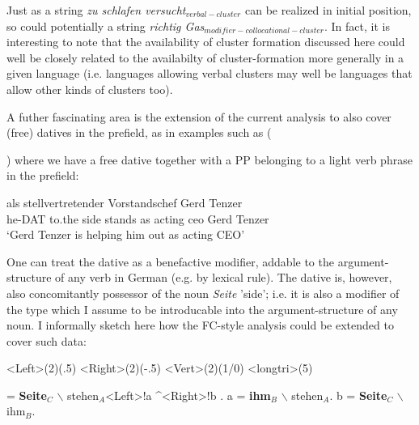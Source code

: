 \documentclass[11pt,a4paper,fleqn]{article}
\newcounter{lsptempcnt}
\newcommand{\mex}[1]{\setcounter{lsptempcnt}{\value{equation}}%
\addtocounter{lsptempcnt}{#1}%
\arabic{lsptempcnt}}%
\begin{document}
\noindent Just as a string \textit{zu schlafen versucht$_{verbal-cluster}$} can be realized in initial position, so could potentially a string 
\textit{richtig Gas$_{modifier-collocational-cluster}$}. In fact, it is interesting to note that the availability of cluster formation discussed here could
well be closely related to the availabilty of cluster-formation more generally in a given language (i.e. languages allowing verbal clusters may well be languages that
allow other kinds of clusters too). 


A futher fascinating area is the extension of the current analysis to also cover (free) datives in the prefield, as in examples such as (\mex{1}) where we have a free dative together with a PP belonging to a light verb phrase in the prefield:\footnotemark
{}
     
\ea
      als stellvertretender Vorstandschef Gerd Tenzer\footnotemark\\                     		
	   he-DAT {to.the side} stands as acting ceo Gerd Tenzer \\
     \glt `Gerd Tenzer is helping him out as acting CEO'
\z

\noindent One can treat the dative as a benefactive modifier, addable to the argument-structure of any verb in German (e.g. by lexical rule).  
The dative is, however, also concomitantly possessor of the noun \textit{Seite} 'side'; i.e. it is also a modifier of the type which I 
assume to be introducable into the  argument-structure of any noun. I informally sketch here how the FC-style analysis
could be extended to cover such data:       
 
\begin{exe}
\ex
\noindent
\jtree
{}<Left>(2)(.5)
<Right>(2)(-.5)
<Vert>(2)(1/0)
<longtri>(5)

\! = {\textbf{Seite}$_C$ $\backslash$ stehen$_A$}<Left>!a ^<Right>!b .
\!a = {\textbf{ihm}$_B$ $\backslash$ stehen$_A$}.
\!b = {\textbf{Seite}$_C$ $\backslash$ ihm$_B$}.

\endjtree
\end{exe}
\end{document}
